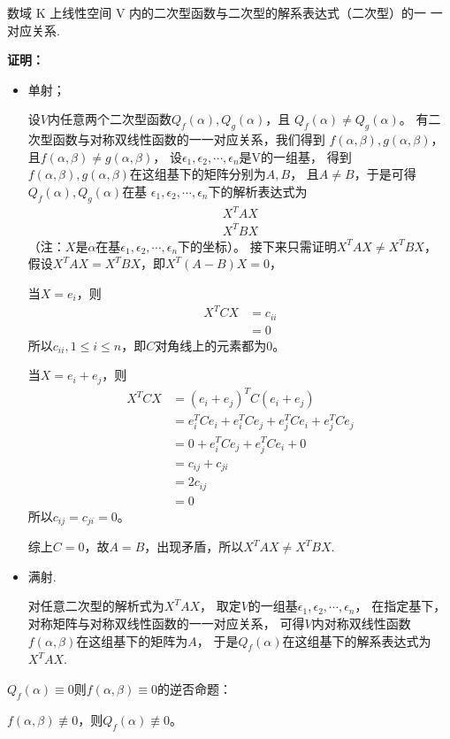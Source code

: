 \documentclass{article}
\begin{document}
\begin{zremark}
  数域 K 上线性空间 V 内的二次型函数与二次型的解系表达式（二次型）的一
  一对应关系.
\end{zremark}

\textbf{证明：}

\begin{itemize}
  \item 单射；

        设$V$内任意两个二次型函数$Q_f(\alpha), Q_g(\alpha)$，且
        $Q_f(\alpha) \neq Q_g(\alpha)$。
        有二次型函数与对称双线性函数的一一对应关系，我们得到
        $f(\alpha, \beta), g(\alpha, \beta)$，且$f(\alpha, \beta) \neq g(\alpha, \beta)$，
        设$\epsilon_1, \epsilon_2, \cdots, \epsilon_n$是V的一组基，
        得到$f(\alpha, \beta), g(\alpha, \beta)$在这组基下的矩阵分别为$A, B$，
        且$A \neq B$，于是可得$Q_f(\alpha), Q_g(\alpha)$在基
        $\epsilon_1, \epsilon_2, \cdots, \epsilon_n$下的解析表达式为
        \begin{align*}
          X^T A X \\
          X^T B X
        \end{align*}
        （注：$X$是$\alpha$在基$\epsilon_1, \epsilon_2, \cdots, \epsilon_n$下的坐标）。
        接下来只需证明$X^T A X \neq X^T B X$，
        假设$X^T A X = X^T B X$，即$X^T (A - B) X = 0$，

        当$X = e_i$，则
        \begin{align*}
          X^T C X
           & = c_{ii} \\
           & = 0
        \end{align*}
        所以$c_{ii}, 1 \leq i \leq n$，即$C$对角线上的元素都为0。

        当$X = e_i + e_j$，则
        \begin{align*}
          X^T C X
           & = (e_i + e_j)^T C (e_i + e_j)                           \\
           & = e_i^T C e_i + e_i^T C e_j + e_j^T C e_i + e_j^T C e_j \\
           & = 0 + e_i^T C e_j + e_j^T C e_i + 0                     \\
           & = c_{ij} + c_{ji}                                       \\
           & = 2 c_{ij}                                              \\
           & = 0
        \end{align*}
        所以$c_{ij} = c_{ji} = 0$。

        综上$C = 0$，故$A = B$，出现矛盾，所以$X^T A X \neq X^T B X$.

  \item 满射.

        对任意二次型的解析式为$X^T A X$，
        取定$V$的一组基$\epsilon_1, \epsilon_2, \cdots, \epsilon_n$，
        在指定基下，对称矩阵与对称双线性函数的一一对应关系，
        可得$V$内对称双线性函数$f(\alpha, \beta)$在这组基下的矩阵为$A$，
        于是$Q_f(\alpha)$在这组基下的解系表达式为$X^T A X$.

\end{itemize}

\begin{zremark}
  $Q_f(\alpha) \equiv 0$则$f(\alpha, \beta) \equiv 0$的逆否命题：

  $f(\alpha, \beta) \not \equiv 0$，则$Q_f(\alpha) \not \equiv 0$。
\end{zremark}
\end{document}

